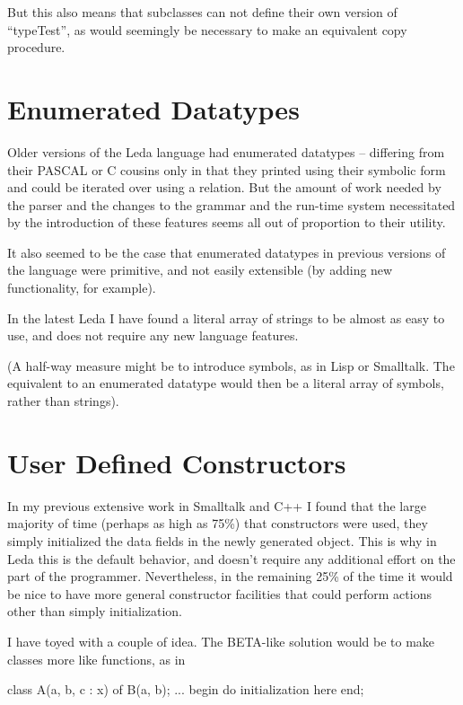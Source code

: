 But this also means that subclasses can not define their own version of
``typeTest'', as would seemingly be necessary to make an equivalent copy
procedure.

\section{Enumerated Datatypes}

Older versions of the Leda language had enumerated datatypes -- differing
from their PASCAL or C cousins only in that they printed using their
symbolic form and could be iterated over using a relation.
But the amount of work needed by the parser and the changes to the
grammar and the run-time system necessitated by the introduction of
these features seems all out of proportion to their utility.

It also seemed to be the case that enumerated datatypes in previous
versions of the language were primitive, and not easily extensible (by
adding new functionality, for example).

In the latest Leda I have found a literal array of strings to be
almost as easy to use, and does not require any new language features.

(A half-way measure might be to introduce symbols, as in Lisp or Smalltalk.
The equivalent to an enumerated datatype would then be a literal array
of symbols, rather than strings).

\section{User Defined Constructors}

In my previous extensive work in Smalltalk and C++ I found that the large
majority of time (perhaps as high as 75\%) that constructors
were used, they simply initialized the data fields in the newly
generated object.  This is why in Leda this is the default behavior,
and doesn't require any additional effort on the part of the programmer.
Nevertheless, in the remaining 25\% of the time it would be nice
to have more general constructor facilities that could perform
actions other than simply initialization.

I have toyed with a couple of idea.  The BETA-like solution would be
to make classes more like functions, as in
\begin{cprog}

	class A(a, b, c : x) of B(a, b);
		...
	begin
		{ do initialization here }
	end;

\end{cprog}

